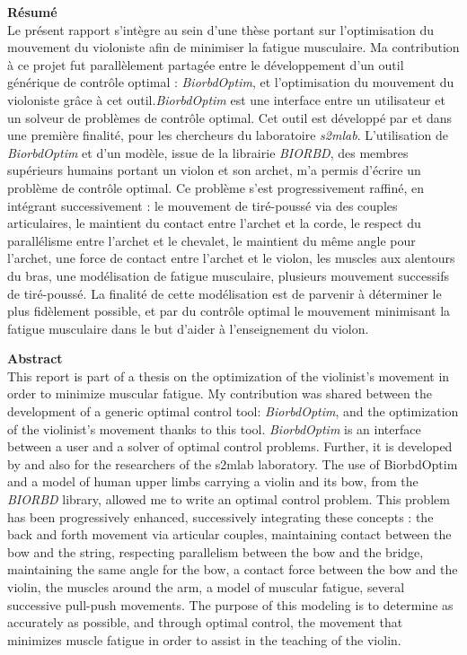 \newpage
{}
\textbf{\huge Résumé}
\vspace{0.5cm}\\\tab
Le présent rapport s'intègre au sein d'une thèse portant sur l’optimisation du mouvement du violoniste afin de minimiser la fatigue musculaire. Ma contribution à ce projet fut parallèlement partagée entre le développement d'un outil générique de contrôle optimal : \emph{BiorbdOptim}, et l'optimisation du mouvement du violoniste grâce à cet outil.\emph{BiorbdOptim} est une interface entre un utilisateur et un solveur de problèmes de contrôle optimal. Cet outil est développé par et dans une première finalité, pour les chercheurs du laboratoire \emph{s2mlab}. L'utilisation de \emph{BiorbdOptim} et d'un modèle, issue de la librairie \emph{BIORBD}, des membres supérieurs humains portant un violon et son archet, m'a permis d'écrire un problème de contrôle optimal. Ce problème s'est progressivement raffiné, en intégrant successivement : le mouvement de tiré-poussé via des couples articulaires, le maintient du contact entre l'archet et la corde, le respect du parallélisme entre l'archet et le chevalet, le maintient du même angle pour l'archet, une force de contact entre l'archet et le violon, les muscles aux alentours du bras, une modélisation de fatigue musculaire, plusieurs mouvement successifs de tiré-poussé. %
La finalité de cette modélisation est de parvenir à déterminer le plus fidèlement possible, et par du contrôle optimal le mouvement minimisant la fatigue musculaire dans le but d’aider à l’enseignement du violon.

\vspace{1.5cm}
\textbf{\huge Abstract}
\vspace{0.5cm}\\\tab
This report is part of a thesis on the optimization of the violinist's movement in order to minimize muscular fatigue. My contribution was shared between the development of a generic optimal control tool: \emph{BiorbdOptim}, and the optimization of the violinist's movement thanks to this tool. \emph{BiorbdOptim} is an interface between a user and a solver of optimal control problems. Further, it is developed by and also for the researchers of the s2mlab laboratory. The use of BiorbdOptim and a model of human upper limbs carrying a violin and its bow, from the \emph{BIORBD} library, allowed me to write an optimal control problem. This problem has been progressively enhanced, successively integrating these concepts : the back and forth movement via articular couples, maintaining contact between the bow and the string, respecting parallelism between the bow and the bridge, maintaining the same angle for the bow, a contact force between the bow and the violin, the muscles around the arm, a model of muscular fatigue, several successive pull-push movements. %
The purpose of this modeling is to determine as accurately as possible, and through optimal control, the movement that minimizes muscle fatigue in order to assist in the teaching of the violin.





